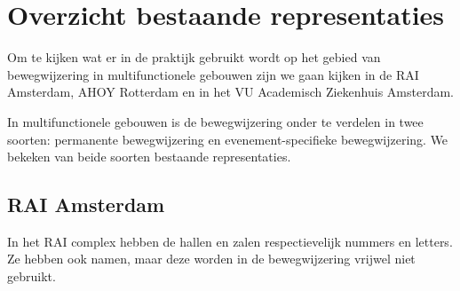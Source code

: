 \chapter{Overzicht bestaande representaties}

Om te kijken wat er in de praktijk gebruikt wordt op het gebied van bewegwijzering in multifunctionele gebouwen zijn we gaan kijken in de RAI Amsterdam, AHOY Rotterdam en in het VU Academisch Ziekenhuis Amsterdam.

In multifunctionele gebouwen is de bewegwijzering onder te verdelen in twee soorten: permanente bewegwijzering en evenement-specifieke bewegwijzering. We bekeken van beide soorten bestaande representaties.


\section{RAI Amsterdam} \label{sectie:overzicht_rai}

In het RAI complex hebben de hallen en zalen respectievelijk nummers en letters. Ze hebben ook namen, maar deze worden in de bewegwijzering vrijwel niet gebruikt.

